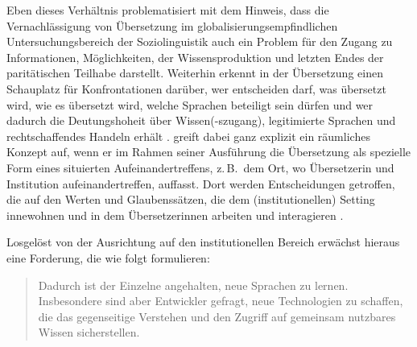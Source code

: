 Eben dieses Verhältnis problematisiert \citet[630\psq]{tesseur_incorporating_2017} mit dem Hinweis, dass die Vernachlässigung von Übersetzung im globalisierungsempfindlichen Untersuchungsbereich der Soziolinguistik auch ein Problem für den Zugang zu Informationen, Möglichkeiten, der Wissensproduktion und letzten Endes der paritätischen Teilhabe darstellt. Weiterhin erkennt \citeauthor{tesseur_incorporating_2017} in der Übersetzung einen Schauplatz für Konfrontationen darüber, wer entscheiden darf, was übersetzt wird, wie es übersetzt wird, welche Sprachen beteiligt sein dürfen und wer dadurch die Deutungshoheit über Wissen(-szugang), legitimierte Sprachen und rechtschaffendes Handeln erhält \citep[631]{tesseur_incorporating_2017}. \citeauthor{tesseur_incorporating_2017} greift dabei ganz explizit ein räumliches Konzept auf, wenn er im Rahmen seiner Ausführung die Übersetzung als spezielle Form eines situierten Aufeinandertreffens, z.\,B.\ dem Ort, wo Übersetzer{\textperiodcentered}in und Institution aufeinandertreffen, auffasst. Dort werden Entscheidungen getroffen, die auf den Werten und Glaubenssätzen, die dem (institutionellen) Setting innewohnen und in dem Übersetzer{\textperiodcentered}innen arbeiten und interagieren \citep[632]{tesseur_incorporating_2017}.

Losgelöst von der Ausrichtung auf den institutionellen Bereich erwächst hieraus eine Forderung, die \citeauthor{burchardt_deutsche_2012} wie folgt formulieren:

\begin{quote}
Dadurch ist der Einzelne angehalten, neue Sprachen zu lernen. Insbesondere sind aber Entwickler gefragt, neue Technologien zu schaffen, die das gegenseitige Verstehen und den Zugriff auf gemeinsam nutzbares Wissen sicherstellen. \citep[5]{burchardt_deutsche_2012}
\end{quote}

